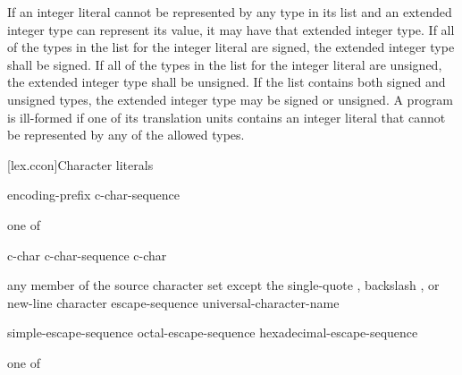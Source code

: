 \pnum
If an integer literal cannot be represented by any type in its list and
an extended integer type can represent its value, it may have that
extended integer type. If all of the types in the list for the integer literal
are signed, the extended integer type shall be signed. If all of the
types in the list for the integer literal are unsigned, the extended integer
type shall be unsigned. If the list contains both signed and unsigned
types, the extended integer type may be signed or unsigned. A program is
ill-formed if one of its translation units contains an integer literal
that cannot be represented by any of the allowed types.

[lex.ccon]{Character literals}

%
\begin{bnf}
\br
    encoding-prefix\opt{}  c-char-sequence 
\end{bnf}

\begin{bnf}
 \textnormal{one of}\br
    \quad{}\quad{}\quad{}
\end{bnf}

\begin{bnf}
\br
    c-char\br
    c-char-sequence c-char
\end{bnf}

\begin{bnftab}
\br
\>\textnormal{any member of the source character set except}\br
\>\>\textnormal{the single-quote , backslash \terminal{\textbackslash}, or new-line character}\br
\>escape-sequence\br
\>universal-character-name
\end{bnftab}

\begin{bnf}
\br
    simple-escape-sequence\br
    octal-escape-sequence\br
    hexadecimal-escape-sequence
\end{bnf}

\begin{bnf}
 \textnormal{one of}\br
    \quad{}\quad{}\quad\terminal{\textbackslash\textbackslash}\br
    \quad{}\quad{}\quad{}\quad{}\quad{}\quad{}
\end{bnf}

